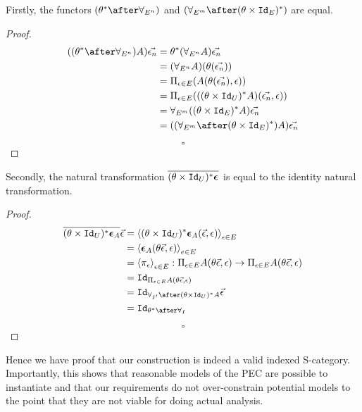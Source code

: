 \documentclass{Report}
\begin{document}
\begin{theorem}
    Firstly, the functors $(\theta\star\after\allEn)$ and $(\allEm\after(\theta\times\Id{E})\star)$ are equal.

\end{theorem}

\begin{proof}
    
\begin{align}
    ((\theta\star\after\allEn)A)\env &= \theta\star(\allEn A)\env\\
    &= (\allEn A)(\theta(\env))\\
    &= \Pi_{\e\in E}(A(\theta(\env), \e))\\
    &= \Pi_{\e\in E}(((\theta\times \Id{U})\star A)(\env, \e))\\
    &= \allEm((\theta\times\Id{E})\star A)\env\\
    &= ((\allEm\after(\theta\times\Id{E})\star)A)\env
\end{align}

$$\square$$
\end{proof}


\begin{theorem}
    Secondly, the natural transformation $\overline{(\theta\times\texttt{Id}_{U})^* \boldsymbol{\epsilon}_{}}$ is equal to the identity natural transformation.

\end{theorem}

\begin{proof}
\begin{align}
    \bar{(\theta\times\Id{U})\star \counit{A}} \ev  & = \finpr{(\theta\times\Id{U})\star\counit{A}(\ev, \e)}{\e\in E}\\
    & = \finpr{\counit{A}(\theta\ev, \e)}{e\in E}\\
    & = \finpr{\pi_\e}{\e\in E}: \Pi_{\e\in E}A(\theta\ev, \e) \rightarrow \Pi_{\e\in E}A(\theta\ev, \e)\\
    & = \Id{\Pi_{\e\in E}A(\theta\ev, \e)}\\
    & = \Id{\allII\after(\theta\times\Id{U})\star A}\ev\\
    & = \Id{\theta\star\after\allI}
\end{align}

$$\square$$
\end{proof}

Hence we have proof that our construction is indeed a valid indexed S-category. Importantly, this shows that reasonable models of the PEC are possible to instantiate and that our requirements do not over-constrain potential models to the point that they are not viable for doing actual analysis.
\end{document}
